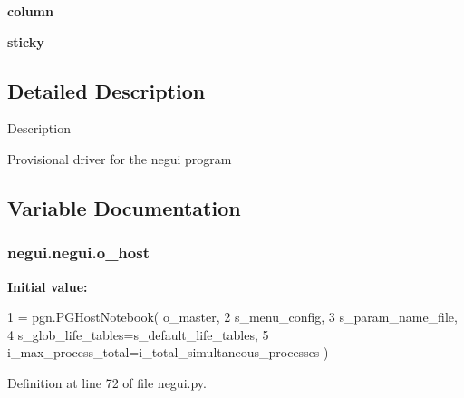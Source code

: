 \begin{DoxyCompactItemize}
\item 
{\bfseries column}\hypertarget{namespacenegui_1_1negui_a98244dd0790e996e2c692c294289f11d}{}\label{namespacenegui_1_1negui_a98244dd0790e996e2c692c294289f11d}

\item 
{\bfseries sticky}\hypertarget{namespacenegui_1_1negui_a1ce52a3e7a52079e56727952c374fb22}{}\label{namespacenegui_1_1negui_a1ce52a3e7a52079e56727952c374fb22}

\end{DoxyCompactItemize}


\subsection{Detailed Description}
\begin{DoxyVerb}Description

Provisional driver for the negui program
\end{DoxyVerb}
 

\subsection{Variable Documentation}
\subsubsection[{\texorpdfstring{o\+\_\+host}{o_host}}]{\setlength{\rightskip}{0pt plus 5cm}negui.\+negui.\+o\+\_\+host}\hypertarget{namespacenegui_1_1negui_ad01236b6cf0c010c914df1d7ee1c96a1}{}\label{namespacenegui_1_1negui_ad01236b6cf0c010c914df1d7ee1c96a1}
{\bfseries Initial value\+:}
\begin{DoxyCode}
1 = pgn.PGHostNotebook( o\_master, 
2             s\_menu\_config, 
3             s\_param\_name\_file, 
4             s\_glob\_life\_tables=s\_default\_life\_tables,
5             i\_max\_process\_total=i\_total\_simultaneous\_processes )
\end{DoxyCode}


Definition at line 72 of file negui.\+py.

